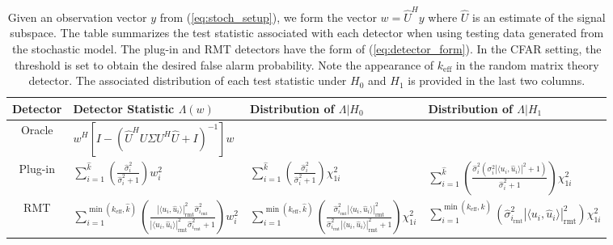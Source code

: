 \begin{table}[h]
\centering
\begin{tabular}{clll}\toprule
 Detector & Detector Statistic $\Lambda(w)$  & Distribution  of $\Lambda|H_0$ & Distribution of $\Lambda|H_1$\\
\midrule
Oracle & $ w^H\left[I-\left(\widehat{U}^HU\Sigma U^H\widehat{U}+I\right)^{-1}\right]w$ &  & \\
Plug-in & $\sum_{i=1}^{\widehat{k}}\left(\frac{\widehat{\sigma}_i^2}{\widehat{\sigma}_i^2+1}\right)w_i^2$ & $\sum_{i=1}^{\widehat{k}}\left(\frac{\widehat{\sigma}_i^2}{\widehat{\sigma}_i^2+1}\right)\chi^2_{1i}$ & $\sum_{i=1}^{\widehat{k}}\left(\frac{\widehat{\sigma}_i^2\left(\sigma^2_i|\langle u_i,\widehat{u}_i\rangle|^2+1\right)}{\widehat{\sigma}_i^2+1}\right)\chi^2_{1i}$\\
 RMT & $\sum_{i=1}^{\min(k_\text{eff},\widehat{k})}\left(\frac{|\langle u_i,\widehat{u}_i\rangle|^2_{\text{rmt}}\widehat{\sigma}_{i_\text{rmt}}^2}{|\langle u_i,\widehat{u}_i\rangle|^2_{\text{rmt}}\widehat{\sigma}_{i_\text{rmt}}^2+1 }\right)w_i^2$ & $\sum_{i=1}^{\min(k_\text{eff},\widehat{k})}\left(\frac{\widehat{\sigma}_{i_\text{rmt}}^2|\langle u_i,\widehat{u}_i\rangle|^2_{\text{rmt}}}{\widehat{\sigma}_{i_\text{rmt}}^2|\langle u_i,\widehat{u}_i\rangle|^2_{\text{rmt}}+1}\right)\chi^2_{1i}$ & $\sum_{i=1}^{\min(k_\text{eff},\widehat{k})}\left(\widehat{\sigma}^2_{i_\text{rmt}}|\langle u_i,\widehat{u}_i\rangle|^2_{\text{rmt}}\right)\chi^2_{1i}$\\
\bottomrule
\end{tabular}
\caption{Given an observation vector $y$ from (\ref{eq:stoch_setup}), we form the vector $w=\widehat{U}^Hy$ where $\widehat{U}$ is an estimate of the signal subspace. The table summarizes the test statistic associated with each detector when using testing data generated from the stochastic model. The plug-in and RMT detectors have the form of (\ref{eq:detector_form}). In the CFAR setting, the threshold is  set to obtain the desired false alarm probability. Note the appearance of $k_\text{eff}$ in the random matrix theory detector. The associated distribution of each test statistic under $H_0$ and $H_1$ is provided in the last two columns.}\vskip-0.2cm
\label{table:summary_stoch}
\end{table}
